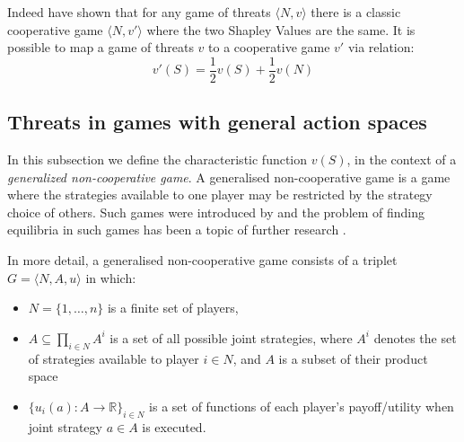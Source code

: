 Indeed \cite{KOHLBERG2018139} have shown that for any game of threats $\langle N,v\rangle$ there is a classic cooperative game $\langle N,v'\rangle$ where the two Shapley Values are the same.
It is possible to map a game of threats $v$ to a cooperative game $v'$ via relation:
\begin{equation}\label{convert1}
v'(S)=\frac{1}{2}v(S)+\frac{1}{2}v(N)
\end{equation}


\subsection{Threats in games with general action spaces}\label{the_value_def3}

In this subsection we define the characteristic function $v(S)$, in the context of a \textit{generalized non-cooperative game}.
A generalised non-cooperative game is a game where the strategies available to one player may be restricted by the strategy choice of others.
Such games were introduced by \cite{Debreu01101952} and the problem of finding equilibria in such games has been a topic of further research \citep{Facchinei2007,fischer2014}.

In more detail, a generalised non-cooperative game consists of a triplet $G = \langle N,A,u \rangle$ in which:
\begin{itemize}
\item	$N=\{1,\dots,n\}$ is a finite set of players,
\item	$A\subseteq \prod_{i\in N}A^i$ is a set of all possible joint strategies, where $A^i$ denotes the set of strategies available to player $i\in N$, and $A$ is a subset of their product space
\item	$\{u_i(a) : A\rightarrow \mathbb{R}\}_{i\in N}$ is a set of functions of each player's payoff/utility when joint strategy $a\in A$ is executed.
\end{itemize}

